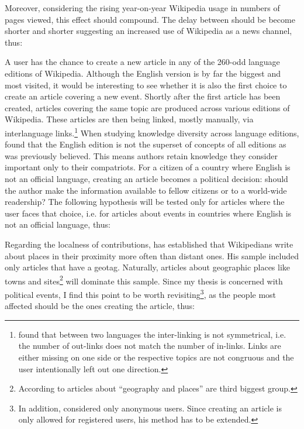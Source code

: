 
Moreover, considering the rising year-on-year Wikipedia usage in numbers of pages viewed\cite{wikipv}, this effect should compound.
The delay between should be become shorter and shorter suggesting an increased use of Wikipedia as a news channel, thus:


A user has the chance to create a new article in any of the 260-odd language editions of Wikipedia.
Although the English version is by far the biggest and most visited, it would be interesting to see whether it is also the first choice to create an article covering a new event.
Shortly after the first article has been created, articles covering the same topic are produced across various editions of Wikipedia.
These articles are then being linked, mostly manually, via interlanguage links.\footnote{\textcite{adar2009information} found that between two languages the inter-linking is not symmetrical, i.e. the number of out-links does not match the number of in-links. Links are either missing on one side or the respective topics are not congruous and the user intentionally left out one direction.}
When studying knowledge diversity across language editions, \textcite{hecht2010tower} found that the English edition is not the superset of concepts of all editions as was previously believed.
This means authors retain knowledge they consider important only to their compatriots.
For a citizen of a country where English is not an official language, creating an article becomes a political decision: should the author make the information available to fellow citizens or to a world-wide readership?
The following hypothesis will be tested only for articles where the user faces that choice, i.e. for articles about events in countries where English is not an official language, thus:


Regarding the localness of contributions, \textcite[57]{hardy2011volunteered} has established that Wikipedians write about places in their proximity more often than distant ones.
His sample included only articles that have a geotag.
Naturally, articles about geographic places like towns and sites\footnote{According to \textcite{kittur2009s} articles about ``geography and places'' are third biggest group.} will dominate this sample.
Since my thesis is concerned with political events, I find this point to be worth revisiting\footnote{In addition, \textcite[61]{hardy2011volunteered} considered only anonymous users. Since creating an article is only allowed for registered users, his method has to be extended.}, as the people most affected should be the ones creating the article, thus:


